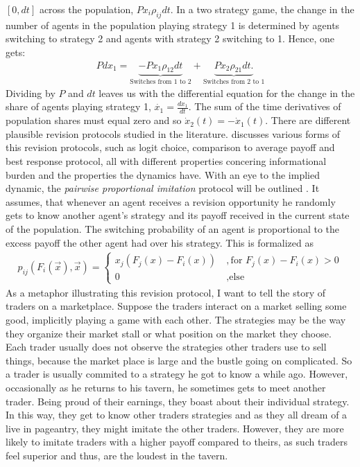 \documentclass[11pt]{article}
\begin{document}
$[0,dt]$ across the population,  $P x_i \rho_{ij} dt$. 
In a two strategy game, the change in the number of agents in the population 
playing strategy 1 is determined by agents switching to strategy 2 
and agents with strategy 2 switching to 1. Hence, one gets:
\begin{align} 
        Pdx_1 =  \underbrace{-Px_1 \rho_{12}dt}_{\text{Switches from 1 to 2}} 
        + \underbrace{Px_2 \rho_{21}dt.}_{\text{Switches from 2 to 1}}
\end{align}
Dividing by $P$ and $dt$ leaves us with the differential equation for
the change in the share of agents playing strategy 1, 
$\dot{x_1} =\frac{dx_1}{dt}$. 
The sum of the time derivatives of population shares must equal zero and so
$\dot{x}_2(t) =- \dot{x}_1(t)$.
There are different plausible revision protocols studied in the literature. 
\textcite[128,129,178]{sandholm_population_2010} discusses various forms of 
this revision protocols, such as logit choice, comparison to average payoff 
and best response 
protocol, all with different properties concering informational 
burden and the
properties the dynamics have. With an eye to the implied dynamic, the 
\textit{pairwise proportional imitation} protocol will be outlined . 
It assumes, that whenever an
agent receives a revision opportunity he randomly gets to know 
another agent's strategy and its payoff received in the current 
state of the population. 
The switching probability of an agent is proportional to the 
excess payoff the other agent had over his strategy. This is formalized as 
\begin{align}
        \label{eq:pairwiseproportionalimitation}
        p_{ij}(F_i(\vec{x}),\vec{x}) =
                \begin{cases}
                        x_j(F_j(x) -F_i(x)) &\ , \text{for } F_j(x) - F_i(x) > 0 \\
                        0 &\ , \text{else}
                \end{cases}
\end{align}
As a metaphor illustrating this revision protocol, I want to tell the 
story of traders on a marketplace.
Suppose the traders interact on a market selling some 
good, implicitly playing a game with each other. The strategies may be the
way they organize their market stall or what position on the market they 
choose. Each trader usually does not
observe the strategies other traders use to sell things, because the market
place is large and the bustle going on complicated. 
So a trader is usually commited to a strategy he got to know a while ago.
However, occasionally as he returns to his tavern, he sometimes gets to meet 
another trader. Being proud of their earnings, they boast about their 
individual strategy. In this way, they get to know
other traders strategies and as they all dream of a live in pageantry,
they might imitate the other traders. 
However, they are more likely to imitate traders with a higher payoff 
compared to theirs, as such traders feel superior and thus, are the 
loudest in the tavern. 
\end{document}
